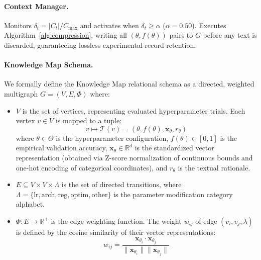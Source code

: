 \documentclass[conference]{IEEEtran}
\newcommand{\dlt}{\delta_t}
\newcommand{\Cmax}{C_{\max}}
\newcommand{\Ct}{C_t}
\begin{document}
\paragraph{Context Manager.}
Monitors $\dlt = |\Ct|/\Cmax$ and activates when $\dlt \geq \alpha$ ($\alpha{=}0.50$). Executes Algorithm~\ref{alg:compression}, writing all $(\theta, f(\theta))$ pairs to $G$ before any text is discarded, guaranteeing lossless experimental record retention.

\paragraph{Knowledge Map Schema.}
We formally define the Knowledge Map relational schema as a directed, weighted multigraph $G = (V, E, \Phi)$ where:
\begin{itemize}[leftmargin=1.5em,itemsep=1pt]
    \item $V$ is the set of vertices, representing evaluated hyperparameter trials. Each vertex $v \in V$ is mapped to a tuple:
    \begin{equation}
        v \mapsto \mathcal{T}(v) = \left( \theta, f(\theta), \mathbf{x}_{\theta}, r_{\theta} \right)
    \end{equation}
    where $\theta \in \Theta$ is the hyperparameter configuration, $f(\theta) \in [0, 1]$ is the empirical validation accuracy, $\mathbf{x}_{\theta} \in \mathbb{R}^d$ is the standardized vector representation (obtained via Z-score normalization of continuous bounds and one-hot encoding of categorical coordinates), and $r_{\theta}$ is the textual rationale.
    \item $E \subseteq V \times V \times \Lambda$ is the set of directed transitions, where $\Lambda = \{ \text{lr}, \text{arch}, \text{reg}, \text{optim}, \text{other} \}$ is the parameter modification category alphabet.
    \item $\Phi: E \to \mathbb{R}^+$ is the edge weighting function. The weight $w_{ij}$ of edge $(v_i, v_j, \lambda)$ is defined by the cosine similarity of their vector representations:
    \begin{equation}
        w_{ij} = \frac{\mathbf{x}_{\theta_i} \cdot \mathbf{x}_{\theta_j}}{\|\mathbf{x}_{\theta_i}\| \|\mathbf{x}_{\theta_j}\|}
    \end{equation}
\end{itemize}
\end{document}
